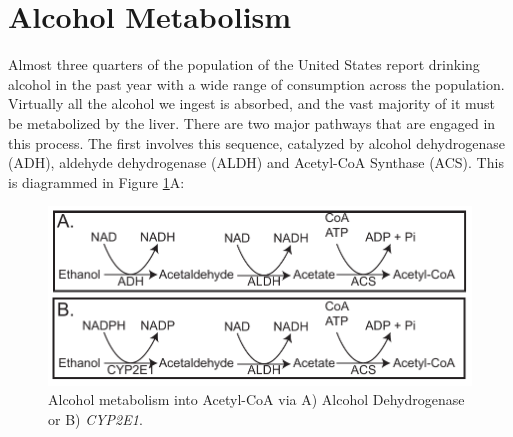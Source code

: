 \documentclass{tufte-handout}
\begin{document}
\section{Alcohol Metabolism}

Almost three quarters of the population of the United States report drinking alcohol in the past year with a wide range of consumption across the population.  Virtually all the alcohol we ingest is absorbed, and the vast majority of it must be metabolized by the liver.  There are two major pathways that are engaged in this process.  The first involves this sequence, catalyzed by alcohol dehydrogenase (ADH),  aldehyde dehydrogenase (ALDH) and Acetyl-CoA Synthase (ACS).  This is diagrammed in Figure \ref{fig:alcohol-adh}A:


\begin{figure}
\includegraphics{figures/alcohol-adh.pdf}
\caption{Alcohol metabolism into Acetyl-CoA via A) Alcohol Dehydrogenase or B) \textit{CYP2E1}.}
\label{fig:alcohol-adh}
\end{figure}
\end{document}
